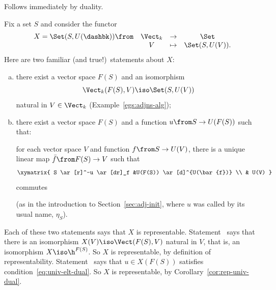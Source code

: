 \begin{pf}
Follows immediately by duality.
\end{pf}

\begin{example}
Fix a set $S$ and consider the functor
\[
\begin{array}{cccc}
X = \Set(S, U(\dashbk))\from            &
\Vect_k &\to            &\Set           \\
                                        &
V       &\mapsto        &\Set(S, U(V)).
\end{array}
\]
Here are two familiar (and true!)\ statements about $X$:
% 
\begin{enumerate}[(b)]
\item   
\label{item:vs-rep-direct}
there exist a vector space $F(S)$ and an isomorphism%
%
%
% 
\begin{equation}        
\label{eq:vect-adj}
\Vect_k(F(S), V) \iso \Set(S, U(V))
\end{equation}
% 
natural in $V \in \Vect_k$
(Example~\ref{egs:adjns-alg});

\item   
\label{item:vs-rep-univ}
there exist a vector space $F(S)$ and a function $u\from S \to U(F(S))$%
%
% 
such that:
% 
\begin{displaytext}
for each vector space $V$ and function $f\from S \to U(V)$, there is a unique
linear map $\bar{f}\from F(S) \to V$ such that
\[
\xymatrix{
S \ar[r]^-u \ar[dr]_f    &U(F(S)) \ar[d]^{U(\bar{f})}    \\
        &
U(V)
}
\]
commutes
\end{displaytext}
% 
(as in the introduction to Section~\ref{sec:adj-init}, where $u$ was called by
its usual name, $\eta_S$).
\end{enumerate}

Each of these two statements says that $X$ is representable.
Statement~ says that there is an isomorphism
$X(V) \iso \Vect(F(S), V)$ natural in $V$, that is, an isomorphism $X \iso
\h^{F(S)}$.  So $X$ is representable, by definition of representability.
Statement~ says that $u \in X(F(S))$ satisfies
condition~\eqref{eq:univ-elt-dual}.  So $X$ is representable, by
Corollary~\ref{cor:rep-univ-dual}.


\end{example}

